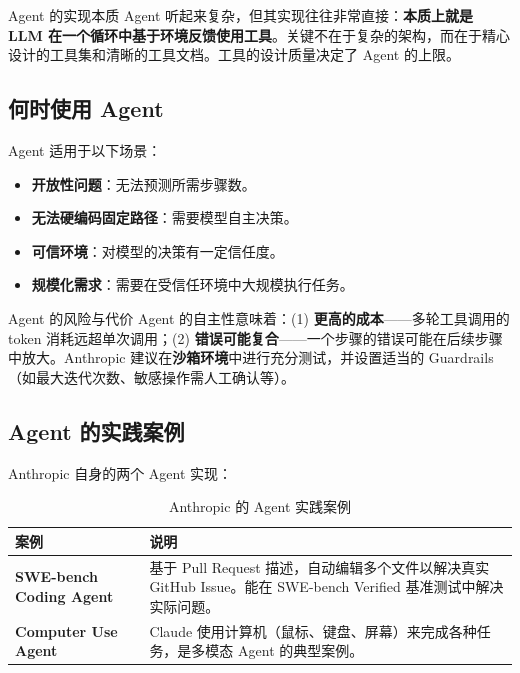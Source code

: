 \documentclass[a4paper]{article}
\begin{document}
\begin{importantbox}{Agent 的实现本质}
Agent 听起来复杂，但其实现往往非常直接：\textbf{本质上就是 LLM 在一个循环中基于环境反馈使用工具}。关键不在于复杂的架构，而在于精心设计的工具集和清晰的工具文档。工具的设计质量决定了 Agent 的上限。
\end{importantbox}

\subsection{何时使用 Agent}

Agent 适用于以下场景：
\begin{itemize}
    \item \textbf{开放性问题}：无法预测所需步骤数。
    \item \textbf{无法硬编码固定路径}：需要模型自主决策。
    \item \textbf{可信环境}：对模型的决策有一定信任度。
    \item \textbf{规模化需求}：需要在受信任环境中大规模执行任务。
\end{itemize}

\begin{warningbox}{Agent 的风险与代价}
Agent 的自主性意味着：(1) \textbf{更高的成本}——多轮工具调用的 token 消耗远超单次调用；(2) \textbf{错误可能复合}——一个步骤的错误可能在后续步骤中放大。Anthropic 建议在\textbf{沙箱环境}中进行充分测试，并设置适当的 Guardrails（如最大迭代次数、敏感操作需人工确认等）。
\end{warningbox}

\subsection{Agent 的实践案例}

Anthropic 自身的两个 Agent 实现：

\begin{table}[H]
\centering
\begin{tabular}{>{\bfseries}p{3.5cm} p{9cm}}
\toprule
案例 & 说明 \\
\midrule
SWE-bench Coding Agent & 基于 Pull Request 描述，自动编辑多个文件以解决真实 GitHub Issue。能在 SWE-bench Verified 基准测试中解决实际问题。 \\
Computer Use Agent & Claude 使用计算机（鼠标、键盘、屏幕）来完成各种任务，是多模态 Agent 的典型案例。 \\
\bottomrule
\end{tabular}
\caption{Anthropic 的 Agent 实践案例}
\end{table}
\end{document}
